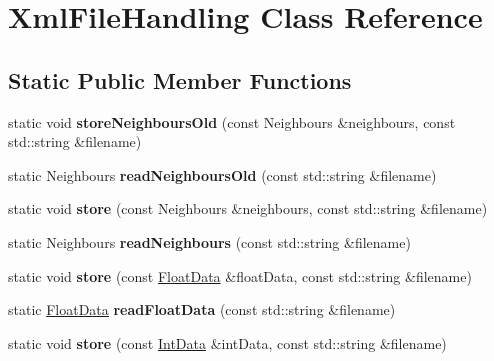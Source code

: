 \hypertarget{classXmlFileHandling}{
\section{XmlFileHandling Class Reference}
\label{classXmlFileHandling}
}
\subsection*{Static Public Member Functions}
\begin{DoxyCompactItemize}
\item 
\hypertarget{classXmlFileHandling_ad8eff572d3d788d8599cc38566c9e720}{
static void {\bfseries storeNeighboursOld} (const Neighbours \&neighbours, const std::string \&filename)}
\label{classXmlFileHandling_ad8eff572d3d788d8599cc38566c9e720}

\item 
\hypertarget{classXmlFileHandling_a6d8d7cafef125ef484497b5dac715a5c}{
static Neighbours {\bfseries readNeighboursOld} (const std::string \&filename)}
\label{classXmlFileHandling_a6d8d7cafef125ef484497b5dac715a5c}

\item 
\hypertarget{classXmlFileHandling_a48cd222099f6f9ac052e067e5bd55d8b}{
static void {\bfseries store} (const Neighbours \&neighbours, const std::string \&filename)}
\label{classXmlFileHandling_a48cd222099f6f9ac052e067e5bd55d8b}

\item 
\hypertarget{classXmlFileHandling_a83a825b8ebc185eded4fb31ba15c827e}{
static Neighbours {\bfseries readNeighbours} (const std::string \&filename)}
\label{classXmlFileHandling_a83a825b8ebc185eded4fb31ba15c827e}

\item 
\hypertarget{classXmlFileHandling_a8d2a29816dbb8ecbbf618b77c7f589de}{
static void {\bfseries store} (const \hyperlink{structFloatData}{FloatData} \&floatData, const std::string \&filename)}
\label{classXmlFileHandling_a8d2a29816dbb8ecbbf618b77c7f589de}

\item 
\hypertarget{classXmlFileHandling_a3856a5534f963da83dfa3315d3e5eb65}{
static \hyperlink{structFloatData}{FloatData} {\bfseries readFloatData} (const std::string \&filename)}
\label{classXmlFileHandling_a3856a5534f963da83dfa3315d3e5eb65}

\item 
\hypertarget{classXmlFileHandling_a6d559e7844a71db3110045970059db43}{
static void {\bfseries store} (const \hyperlink{structIntData}{IntData} \&intData, const std::string \&filename)}
\label{classXmlFileHandling_a6d559e7844a71db3110045970059db43}


\end{DoxyCompactItemize}
